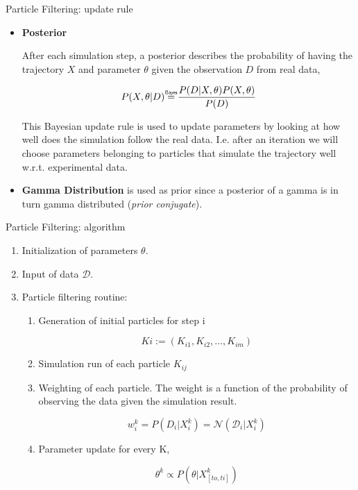 \documentclass[pdf]
{beamer}
\newcommand\bayeseq{\mathrel{\overset{\makebox[0pt]{\mbox{\normalfont\tiny\sffamily Bayes}}}{=}}}
\begin{document}
\begin{frame}{Particle Filtering: update rule}

	\begin{itemize}
	\item \textbf{Posterior}
	
	After each simulation step, a posterior describes the probability of having the trajectory $X$ and
parameter $\theta$ given the observation $D$ from real data,

	\begin{equation}
	P (X, \theta |D) \bayeseq \frac{P(D|X, \theta) P(X, \theta)}{P(D)}
	\end{equation}
	
	This Bayesian update rule is used to update parameters by looking at how well does the simulation follow the real data. I.e. after an iteration we will choose parameters belonging to particles that simulate the trajectory well w.r.t. experimental data.
	
	\item \textbf{Gamma Distribution} is used as prior since a posterior of a gamma is in turn gamma distributed (\textit{prior conjugate}).
	\end{itemize}
	
\end{frame}

\begin{frame}{Particle Filtering: algorithm}
	\begin{enumerate}
		\item Initialization of parameters $\theta$.
		\item Input of data $\mathcal{D}$.
		\item Particle filtering routine:

		\begin{enumerate}
			\item Generation of initial particles for step i
			
			\begin{equation}
				Ki := (K_{i1}, K_{i2}, \dots, K_{im})
			\end{equation}

			\item Simulation run of each particle $K_{ij}$
			\item Weighting of each particle. The weight is a function of the probability of observing the data given the simulation result.

			\begin{equation}
				w_i^k = P(D_i | X_i^k) = \mathcal{N}(\mathcal{D}_i | X_i^k)
			\end{equation}

			\item Parameter update for every K,

			\begin{equation}
				\theta^k \propto P(\theta | X^k_{[to, ti]})
			\end{equation}

		\end{enumerate}

	\end{enumerate}
\end{frame}
\end{document}

